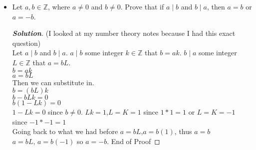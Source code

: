 \documentclass[11pt]{article}
\newenvironment{problem}[2][Problem\!]{\begin{trivlist}
\item[\hskip \labelsep {\bfseries #1}\hskip \labelsep {\bfseries #2.}]}{\end{trivlist}}
\newenvironment{solution}{\begin{proof}[\textbf{\textit{Solution}}]}{\end{proof}}
\newcommand{\zz}{\mathbb Z}   %
\begin{document}
\begin{problem}{4.2}\hfill
\begin{itemize}[itemsep=3em]
\item[(a)]Let $a, b \in \zz$, where $a \neq 0$ and $b \neq 0$. Prove that if $a \mid b$ and $b \mid a$, then $a = b$ or $a = -b$.
\begin{solution}
(I looked at my number theory notes because I had this exact question)\\
Let \(a \mid b\) and \(b \mid a\). \(a \mid b\) some integer \(k \in \mathbb{Z}\) that \(b = ak\). \(b \mid a\) some integer  \(L \in \mathbb{Z}\) that \(a = bL\).\\
\(b = ak\)\\
\(a = bL\)\\
Then we can substitute in.\\
\(b = (bL)k\)\\
\(b - bLk = 0\)\\
\(b(1-Lk) = 0\)\\
\(1 - Lk = 0 \) since \(b \neq 0\).
\(Lk = 1\),\(L = K = 1\) since \(1 * 1 = 1\) or \(L = K = -1\) since \(-1 * -1 = 1\)\\
Going back to what we had before \(a = bL\),\(a = b(1)\), thus \(a = b\)\\
\(a = bL\), \(a = b(-1)\) so \(a = -b\). End of Proof
\end{solution}


\end{itemize}
\end{problem}
\end{document}
